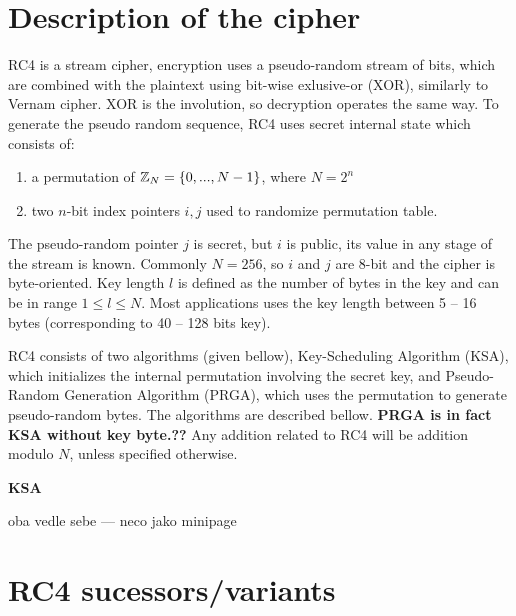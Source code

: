 \section{Description of the cipher}
RC4 is a stream cipher, encryption uses a pseudo-random stream of bits, which are combined with the plaintext using bit-wise exlusive-or (XOR), similarly to Vernam cipher. XOR is the involution, so decryption operates the same way. 
To generate the pseudo random sequence, RC4 uses secret internal state which consists of:
\begin{enumerate}
	\item a permutation of $ \mathbb{Z}_{N} = \{0, ... , N-1\}$, where $ N = 2^{n} $
	\item two $n$-bit index pointers $ i,j $ used to randomize permutation table.
\end{enumerate}
The pseudo-random pointer $ j $ is secret, but $ i $ is public, its value in any stage of the stream is known. Commonly $ N = 256 $, so $ i$ and $j $ are 8-bit and the cipher is byte-oriented. Key length $ l $ is defined as the number of bytes in the key and can be in range $ 1 \leq l \leq N $.  Most applications uses the key length between 5 -- 16 bytes (corresponding to 40 -- 128 bits key).

RC4 consists of two algorithms (given bellow), Key-Scheduling Algorithm (KSA), which initializes the internal permutation involving the secret key, and Pseudo-Random Generation Algorithm (PRGA), which uses the permutation to generate pseudo-random bytes. The algorithms are described bellow. \textbf{PRGA is in fact KSA without key byte.??} Any addition related to RC4 will be addition modulo $ N $, unless specified otherwise.




\begin{algorithm}

\caption{\textbf{KSA}}
\label{ksa}
\end{algorithm}

oba vedle sebe --- neco jako minipage

\begin{algorithm}
\end{algorithm}



\section{RC4 sucessors/variants}

